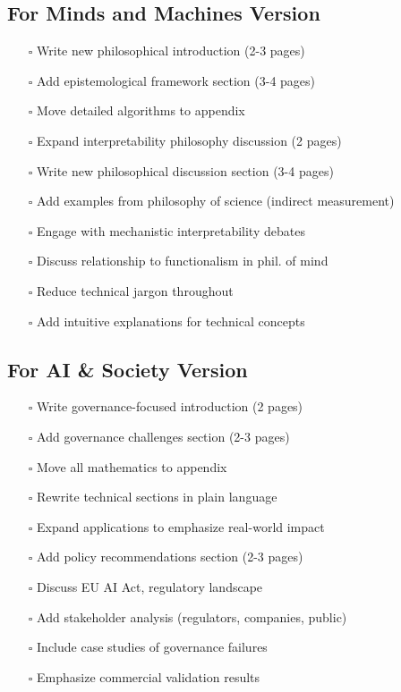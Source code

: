 \documentclass[12pt]{article}
\begin{document}
\subsection{For Minds and Machines Version}

\begin{enumerate}[leftmargin=*]
\item[$\square$] Write new philosophical introduction (2-3 pages)
\item[$\square$] Add epistemological framework section (3-4 pages)
\item[$\square$] Move detailed algorithms to appendix
\item[$\square$] Expand interpretability philosophy discussion (2 pages)
\item[$\square$] Write new philosophical discussion section (3-4 pages)
\item[$\square$] Add examples from philosophy of science (indirect measurement)
\item[$\square$] Engage with mechanistic interpretability debates
\item[$\square$] Discuss relationship to functionalism in phil. of mind
\item[$\square$] Reduce technical jargon throughout
\item[$\square$] Add intuitive explanations for technical concepts
\end{enumerate}

\subsection{For AI \& Society Version}

\begin{enumerate}[leftmargin=*]
\item[$\square$] Write governance-focused introduction (2 pages)
\item[$\square$] Add governance challenges section (2-3 pages)
\item[$\square$] Move all mathematics to appendix
\item[$\square$] Rewrite technical sections in plain language
\item[$\square$] Expand applications to emphasize real-world impact
\item[$\square$] Add policy recommendations section (2-3 pages)
\item[$\square$] Discuss EU AI Act, regulatory landscape
\item[$\square$] Add stakeholder analysis (regulators, companies, public)
\item[$\square$] Include case studies of governance failures
\item[$\square$] Emphasize commercial validation results
\end{enumerate}
\end{document}
